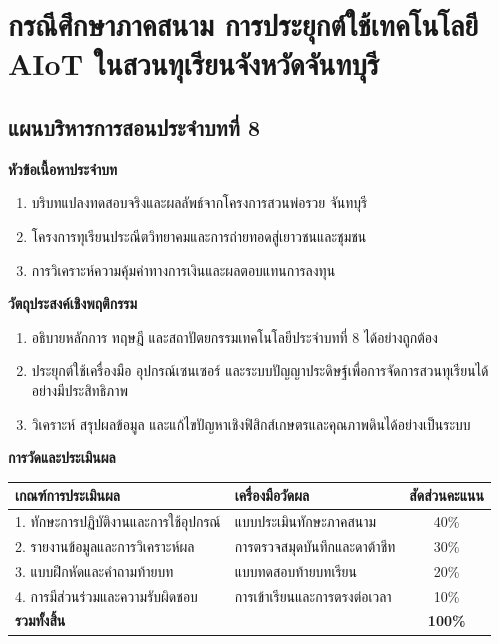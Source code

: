 \chapter{กรณีศึกษาภาคสนาม การประยุกต์ใช้เทคโนโลยี AIoT ในสวนทุเรียนจังหวัดจันทบุรี}
\label{chap:ch08}

\section*{แผนบริหารการสอนประจำบทที่ 8}

\noindent\textbf{หัวข้อเนื้อหาประจำบท}
\begin{enumerate}
    \item บริบทแปลงทดสอบจริงและผลลัพธ์จากโครงการสวนพ่อรวย จันทบุรี
    \item โครงการทุเรียนประณีตวิทยาคมและการถ่ายทอดสู่เยาวชนและชุมชน
    \item การวิเคราะห์ความคุ้มค่าทางการเงินและผลตอบแทนการลงทุน
\end{enumerate}

\noindent\textbf{วัตถุประสงค์เชิงพฤติกรรม}
\begin{enumerate}
    \item อธิบายหลักการ ทฤษฎี และสถาปัตยกรรมเทคโนโลยีประจำบทที่ 8 ได้อย่างถูกต้อง
    \item ประยุกต์ใช้เครื่องมือ อุปกรณ์เซนเซอร์ และระบบปัญญาประดิษฐ์เพื่อการจัดการสวนทุเรียนได้อย่างมีประสิทธิภาพ
    \item วิเคราะห์ สรุปผลข้อมูล และแก้ไขปัญหาเชิงฟิสิกส์เกษตรและคุณภาพดินได้อย่างเป็นระบบ
\end{enumerate}

\noindent\textbf{การวัดและประเมินผล}
\begin{table}[H]
\centering\small
\begin{tabularx}{\textwidth}{p{} p{} c}
\toprule
\textbf{เกณฑ์การประเมินผล} & \textbf{เครื่องมือวัดผล} & \textbf{สัดส่วนคะแนน} \\
\midrule
1. ทักษะการปฏิบัติงานและการใช้อุปกรณ์ & แบบประเมินทักษะภาคสนาม & 40\% \\
2. รายงานข้อมูลและการวิเคราะห์ผล & การตรวจสมุดบันทึกและดาต้าชีท & 30\% \\
3. แบบฝึกหัดและคำถามท้ายบท & แบบทดสอบท้ายบทเรียน & 20\% \\
4. การมีส่วนร่วมและความรับผิดชอบ & การเข้าเรียนและการตรงต่อเวลา & 10\% \\
\midrule
\textbf{รวมทั้งสิ้น} & & \textbf{100\%} \\
\bottomrule
\end{tabularx}
\end{table}
\newpage

